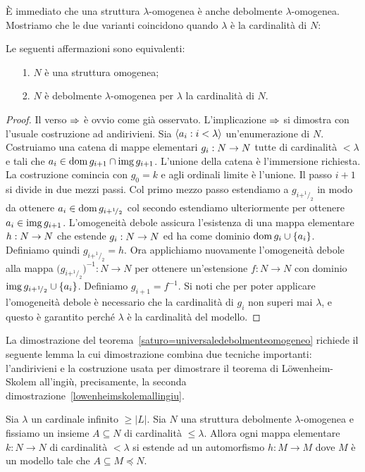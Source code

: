 \`E immediato che una struttura $\lambda$-omogenea \`e anche debolmente $\lambda$-omogenea. Mostriamo che le due varianti coincidono quando $\lambda$ \`e la cardinalit\`a di $N$:

\begin{proposition}\label{omogeneo=debolmenteaomogeneo}
Le seguenti affermazioni sono equivalenti:
\begin{itemize}
\item[1.] $N$ \`e una struttura omogenea;
\item[2.] $N$ \`e debolmente $\lambda$-omogenea per $\lambda$ la cardinalit\`a di $N$.
\end{itemize}
\end{proposition}
\begin{proof}
Il verso $\Rightarrow$ \`e ovvio come gi\`a osservato. L'implicazione $\Rightarrow$ si dimostra con l'usuale costruzione ad andirivieni. Sia $\langle a_i:i<\lambda\rangle$ un'enumerazione di $N$. Costruiamo una catena di mappe elementari $g_i:N\rightarrow N$ tutte di cardinalit\`a $<\lambda$ e tali che $a_i\in\mathop{\rm dom} g_{i+1}\cap\mathop{\rm img} g_{i+1}$. L'unione della catena \`e l'immersione richiesta. La costruzione comincia con $g_0=k$ e agli ordinali limite \`e l'unione.  Il passo $i+1$ si divide in due mezzi passi. Col primo mezzo passo estendiamo a $g_{i+^1\!/_2}$ in modo da ottenere $a_i\in\mathop{\rm dom} g_{i+^1\!/_2}$ col secondo estendiamo ulteriormente per ottenere $a_i\in\mathop{\rm img} g_{i+1}$. L'omogeneit\`a debole assicura l'esistenza di una mappa elementare $h:N\rightarrow N$ che estende $g_i:N\rightarrow N$ ed ha come dominio $\mathop{\rm dom} g_i\cup\{a_i\}$. Definiamo quindi  $g_{i+^1\!/_2}=h$. Ora applichiamo nuovamente l'omogeneit\`a debole alla mappa $\big(g_{i+^1\!/_2})^{-1}:N\to N$ per ottenere un'estensione $f:N\to N$ con dominio $\mathop{\rm img} g_{i+^1\!/_2}\cup\{a_i\}$. Definiamo $g_{i+1}=f^{-1}$. Si noti che per poter applicare l'omogeneit\`a debole \`e necessario che la cardinalit\`a di $g_i$ non superi mai $\lambda$, e questo \`e garantito perch\'e $\lambda$ \`e la cardinalit\`a del modello.
\end{proof}

La dimostrazione del teorema~\ref{saturo=universaledebolmenteomogeneo} richiede il seguente lemma la cui dimostrazione combina due tecniche importanti: l'andirivieni e la costruzione usata per dimostrare il teorema di L\"owenheim-Skolem all'ingi\`u, precisamente, la seconda dimostrazione~\ref{lowenheimskolemallingiu}.

\begin{lemma}\label{debolmenteomogeneoandirivieni}
Sia $\lambda$ un cardinale infinito $\ge |L|$. Sia $N$ una struttura debolmente $\lambda$-omogenea e fissiamo un insieme $A\subseteq N$ di cardinalit\`a $\le\lambda$. Allora ogni mappa elementare $k:N\to N$ di cardinalit\`a $<\lambda$ si estende ad un automorfismo $h:M\to M$ dove $M$ \`e un modello tale che $A\subseteq M\preceq N$.
\end{lemma}

